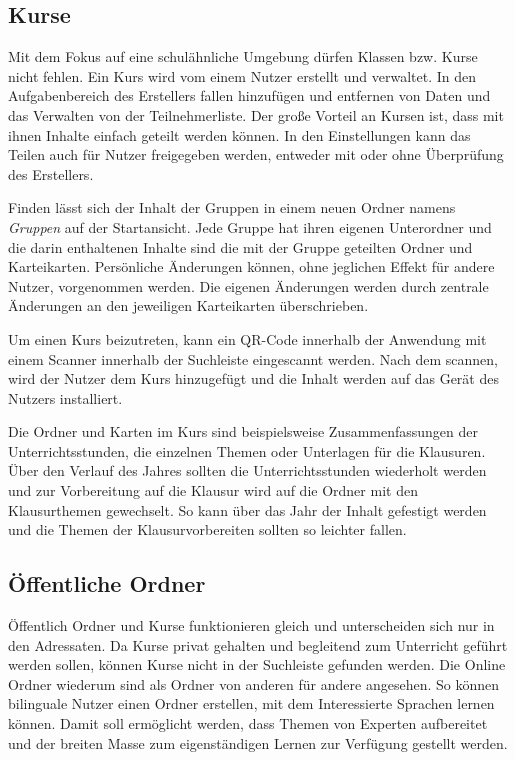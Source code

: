 \subsection{Kurse}
Mit dem Fokus auf eine schulähnliche Umgebung dürfen Klassen bzw. Kurse nicht fehlen. Ein Kurs wird vom einem Nutzer erstellt und verwaltet. In den Aufgabenbereich des Erstellers fallen hinzufügen und entfernen von Daten und das Verwalten von der Teilnehmerliste. Der große Vorteil an Kursen ist, dass mit ihnen Inhalte einfach geteilt werden können. In den Einstellungen kann das Teilen auch für Nutzer freigegeben werden, entweder mit oder ohne Überprüfung des Erstellers.

Finden lässt sich der Inhalt der Gruppen in einem neuen Ordner namens \textit{Gruppen} auf der Startansicht. Jede Gruppe hat ihren eigenen Unterordner und die darin enthaltenen Inhalte sind die mit der Gruppe geteilten Ordner und Karteikarten. Persönliche Änderungen können, ohne jeglichen Effekt für andere Nutzer, vorgenommen werden. Die eigenen Änderungen werden durch zentrale Änderungen an den jeweiligen Karteikarten überschrieben.

Um einen Kurs beizutreten, kann ein QR-Code innerhalb der Anwendung mit einem Scanner innerhalb der Suchleiste eingescannt werden. Nach dem scannen, wird der Nutzer dem Kurs hinzugefügt und die Inhalt werden auf das Gerät des Nutzers installiert.

Die Ordner und Karten im Kurs sind beispielsweise Zusammenfassungen der Unterrichtsstunden, die einzelnen Themen oder Unterlagen für die Klausuren. Über den Verlauf des Jahres sollten die Unterrichtsstunden wiederholt werden und zur Vorbereitung auf die Klausur wird auf die Ordner mit den Klausurthemen gewechselt. So kann über das Jahr der Inhalt gefestigt werden und die Themen der Klausurvorbereiten sollten so leichter fallen.

\subsection{Öffentliche Ordner}
Öffentlich Ordner und Kurse funktionieren gleich und unterscheiden sich nur in den Adressaten. Da Kurse privat gehalten und begleitend zum Unterricht geführt werden sollen, können Kurse nicht in der Suchleiste gefunden werden. Die Online Ordner wiederum sind als Ordner von anderen für andere angesehen. So können bilinguale Nutzer einen Ordner erstellen, mit dem Interessierte Sprachen lernen können. Damit soll ermöglicht werden, dass Themen von Experten aufbereitet und der breiten Masse zum eigenständigen Lernen zur Verfügung gestellt werden.

